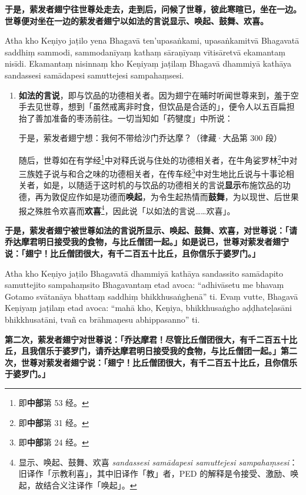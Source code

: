 \textbf{于是，萦发者翅宁往世尊处走去，走到后，问候了世尊，彼此寒暄已，坐在一边。世尊便对坐在一边的萦发者翅宁以如法的言说显示、唤起、鼓舞、欢喜。}

Atha kho Keṇiyo jaṭilo yena Bhagavā ten’upasaṅkami, upasaṅkamitvā Bhagavatā saddhiṃ sammodi, sammodanīyaṃ kathaṃ sāraṇīyaṃ vītisāretvā ekamantaṃ nisīdi. Ekamantaṃ nisinnaṃ kho Keṇiyaṃ jaṭilaṃ Bhagavā dhammiyā kathāya sandassesi samādapesi samuttejesi sampahaṃsesi.

\begin{enumerate}\item \textbf{如法的言说}，即与饮品的功德相关者。因为翅宁在晡时听闻世尊来到，羞于空手去见世尊，想到「虽然戒离非时食，但饮品是合适的」，便令人以五百扁担抬了善加准备的枣汤前往。一切当知如「药犍度」中所说：\begin{quoting}于是，萦发者翅宁想：我何不带给沙门乔达摩？（律藏·大品第 300 段）\end{quoting}随后，世尊如在有学经\footnote{即\textbf{中部}第 53 经。}中对释氏说与住处的功德相关者，在牛角娑罗林\footnote{即\textbf{中部}第 31 经。}中对三族姓子说与和合之味的功德相关者，在传车经\footnote{即\textbf{中部}第 24 经。}中对生地比丘说与十事论相关者，如是，以随适于这时机的与饮品的功德相关的言说\textbf{显示}布施饮品的功德，再为敦促应作如是功德而\textbf{唤起}，为令生起热情而\textbf{鼓舞}，为以现世、后世果报之殊胜令欢喜而\textbf{欢喜}\footnote{显示、唤起、鼓舞、欢喜 \textit{sandassesi samādapesi samuttejesi sampahaṃsesi}：旧译作「示教利喜」，其中旧译作「教」者，PED 的解释是令接受、激励、唤起，故结合义注译作「唤起」。}，因此说「以如法的言说……欢喜」。\end{enumerate}

\textbf{于是，萦发者翅宁被世尊如法的言说所显示、唤起、鼓舞、欢喜，对世尊说：「请乔达摩君明日接受我的食物，与比丘僧团一起。」如是说已，世尊对萦发者翅宁说：「翅宁！比丘僧团很大，有千二百五十比丘，且你信乐于婆罗门。」}

Atha kho Keṇiyo jaṭilo Bhagavatā dhammiyā kathāya sandassito samādapito samuttejito sampahaṃsito Bhagavantaṃ etad avoca: “adhivāsetu me bhavaṃ Gotamo svātanāya bhattaṃ saddhiṃ bhikkhusaṅghenā” ti. Evaṃ vutte, Bhagavā Keṇiyaṃ jaṭilaṃ etad avoca: “mahā kho, Keṇiya, bhikkhusaṅgho aḍḍhateḷasāni bhikkhusatāni, tvañ ca brāhmaṇesu abhippasanno” ti.

\textbf{第二次，萦发者翅宁对世尊说：「乔达摩君！尽管比丘僧团很大，有千二百五十比丘，且我信乐于婆罗门，请乔达摩君明日接受我的食物，与比丘僧团一起。」第二次，世尊对萦发者翅宁说：「翅宁！比丘僧团很大，有千二百五十比丘，且你信乐于婆罗门。」}

